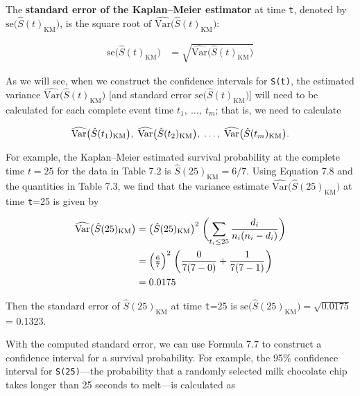 \documentclass[
]{report}
\begin{document}
The \textbf{standard error of the Kaplan--Meier estimator} at time \texttt{t}, denoted by \(\scriptstyle \mathrm{se}\bigl(\hat S(t)_{\mathrm{KM}}\bigr)\), is the square root of \(\scriptstyle \widehat{\mathrm{Var}}\bigl(\hat S(t)_{\mathrm{KM}}\bigr)\):

\begin{align}\label{9.9}
\mathrm{se}\bigl(\hat S(t)_{\mathrm{KM}}\bigr)
&= \sqrt{\widehat{\mathrm{Var}}\bigl(\hat S(t)_{\mathrm{KM}}\bigr)}
\tag{7.9}
\end{align}

As we will see, when we construct the confidence intervals for \texttt{S(t)}, the estimated variance \(\scriptstyle \widehat{\mathrm{Var}}\bigl(\hat S(t)_{\mathrm{KM}}\bigr)\) {[}and standard error \(\scriptstyle \mathrm{se}\bigl(\hat S(t)_{\mathrm{KM}}\bigr)\){]} will need to be calculated for each complete event time \(\scriptstyle t_1,\ \dots,\ t_m\); that is, we need to calculate

\begin{align}
\widehat{\mathrm{Var}}\bigl(\hat S(t_1)_{\mathrm{KM}}\bigr),\;\widehat{\mathrm{Var}}\bigl(\hat S(t_2)_{\mathrm{KM}}\bigr),\;\dots,\;\widehat{\mathrm{Var}}\bigl(\hat S(t_m)_{\mathrm{KM}}\bigr).\notag
\end{align}

For example, the Kaplan--Meier estimated survival probability at the complete time \(t=25\) for the data in Table 7.2 is \(\scriptstyle \hat S(25)_{\mathrm{KM}} = 6/7\). Using Equation 7.8 and the quantities in Table 7.3, we find that the variance estimate \(\scriptstyle \widehat{\mathrm{Var}}\bigl(\hat S(25)_{\mathrm{KM}}\bigr)\) at time \texttt{t}=25 is given by

\begin{align}
\widehat{\mathrm{Var}}\bigl(\hat S(25)_{\mathrm{KM}}\bigr)
&= \bigl(\hat S(25)_{\mathrm{KM}}\bigr)^2 \;\biggl(\sum_{t_i \le 25}\frac{d_i}{n_i(n_i - d_i)}\biggr) \\
&= \Bigl(\tfrac{6}{7}\Bigr)^2 \;\biggl(\frac{0}{7(7-0)} + \frac{1}{7(7-1)}\biggr) \\
&= 0.0175 
\notag
\end{align}

Then the standard error of \(\scriptstyle \hat S(25)_{\mathrm{KM}}\) at time \texttt{t}=25 is \(\scriptstyle \mathrm{se}\bigl(\hat S(25)_{\mathrm{KM}}\bigr) = \sqrt{0.0175}\) = 0.1323.

With the computed standard error, we can use Formula 7.7 to construct a confidence interval for a survival probability. For example, the 95\% confidence interval for \texttt{S(25)}---the probability that a randomly selected milk chocolate chip takes longer than 25 seconds to melt---is calculated as
\end{document}
